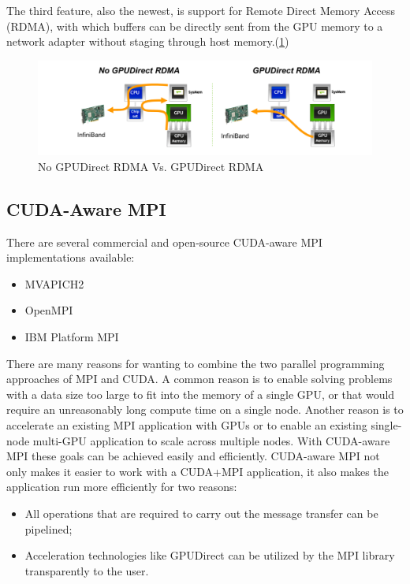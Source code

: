 \documentclass[article]{scrartcl}
\begin{document}
The third feature, also the newest, is support for Remote Direct Memory Access (RDMA), with which buffers can be directly sent from the GPU memory to a network adapter without staging through host memory.(\ref{fig:GPUDirectRDMA})
\begin{figure}[htpb]
	\centering
	\includegraphics[width=\textwidth,keepaspectratio=true]{../figs/GPUDIrectRDMA.png}
	\caption{No GPUDirect RDMA Vs. GPUDirect RDMA\cite{introCudaAware}}
	\label{fig:GPUDirectRDMA}
\end{figure}

\subsection{CUDA-Aware MPI}
There are several commercial and open-source CUDA-aware MPI implementations available:
\begin{itemize}
	\item MVAPICH2
	\item OpenMPI
	\item IBM Platform MPI 
\end{itemize}
There are many reasons for wanting to combine the two parallel programming approaches of MPI and CUDA. A common reason is to enable solving problems with a data size too large to fit into the memory of a single GPU, or that would require an unreasonably long compute time on a single node. Another reason is to accelerate an existing MPI application with GPUs or to enable an existing single-node multi-GPU application to scale across multiple nodes. With CUDA-aware MPI these goals can be achieved easily and efficiently.
CUDA-aware MPI not only makes it easier to work with a CUDA+MPI application, it also makes the application run more efficiently for two reasons:
\begin{itemize}
	\item All operations that are required to carry out the message transfer can be pipelined;
	\item Acceleration technologies like GPUDirect can be utilized by the MPI library transparently to the user.
\end{itemize}
\end{document}
